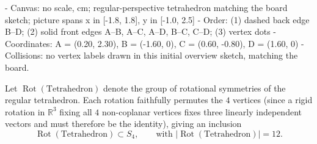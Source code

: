 \begin{content}
\begin{hidden}
- Canvas: no scale, cm; regular-perspective tetrahedron matching the board sketch; picture spans x in [-1.8, 1.8], y in [-1.0, 2.5]
- Order: (1) dashed back edge B--D; (2) solid front edges A--B, A--C, A--D, B--C, C--D; (3) vertex dots
- Coordinates: A = (0.20, 2.30), B = (-1.60, 0), C = (0.60, -0.80), D = (1.60, 0)
- Collisions: no vertex labels drawn in this initial overview sketch, matching the board.
\end{hidden}
\begin{center}
\end{center}

Let $\operatorname{Rot}(\text{Tetrahedron})$ denote the group of rotational symmetries of the regular tetrahedron. Each rotation faithfully permutes the $4$ vertices (since a rigid rotation in $\mathbb{R}^3$ fixing all $4$ non-coplanar vertices fixes three linearly independent vectors and must therefore be the identity), giving an inclusion
\[
\operatorname{Rot}(\text{Tetrahedron}) \subset S_4, \qquad \text{with } |\operatorname{Rot}(\text{Tetrahedron})| = 12.
\]
\end{content}



